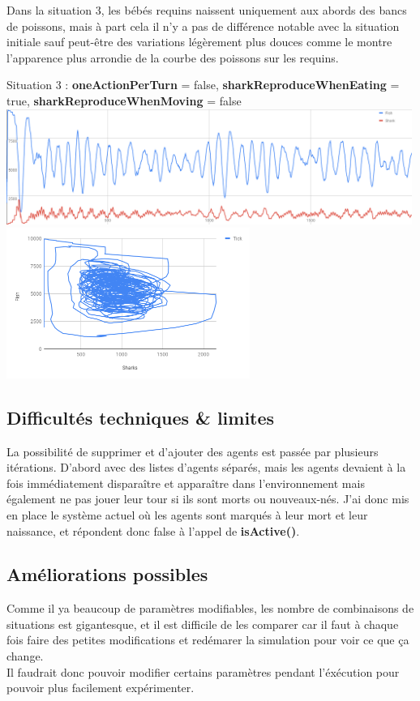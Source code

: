 \documentclass[11pt,a4paper,oneside]{report}
\begin{document}
\newpage

Dans la situation 3, les bébés requins naissent uniquement aux abords des bancs de poissons, mais à part cela il n'y a pas de différence notable avec la situation initiale sauf peut-être des variations légèrement plus douces comme le montre l'apparence plus arrondie de la courbe des poissons sur les requins.
\begin{center}
Situation 3 : \textbf{oneActionPerTurn} = false, \textbf{sharkReproduceWhenEating} = true, \textbf{sharkReproduceWhenMoving} = false
\includegraphics[width=500px]{wator_3}\\
\includegraphics[width=300px]{wator_3b}
\end{center}

\subsection*{Difficultés techniques \& limites}
La possibilité de supprimer et d'ajouter des agents est passée par plusieurs itérations. D'abord avec des listes d'agents séparés, mais les agents devaient à la fois immédiatement disparaître et apparaître dans l'environnement mais également ne pas jouer leur tour si ils sont morts ou nouveaux-nés. J'ai donc mis en place le système actuel où les agents sont marqués à leur mort et leur naissance, et répondent donc false à l'appel de \textbf{isActive()}.

\subsection*{Améliorations possibles}
Comme il ya beaucoup de paramètres modifiables, les nombre de combinaisons de situations est gigantesque, et il est difficile de les comparer car il faut à chaque fois faire des petites modifications et redémarer la simulation pour voir ce que ça change.\\
Il faudrait donc pouvoir modifier certains paramètres pendant l'éxécution pour pouvoir plus facilement expérimenter.
\end{document}

